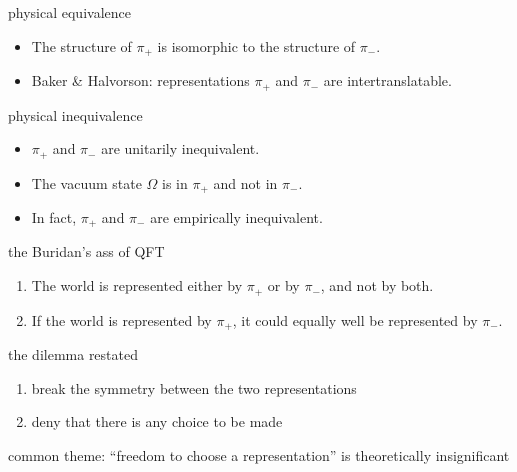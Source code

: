 \documentclass{beamer}
\begin{document}
\begin{frame}{physical equivalence}

\begin{itemize}
\item The structure of $\pi _{+}$ is isomorphic to the structure of
  $\pi _{-}$.
\item Baker \& Halvorson: representations $\pi _{+}$ and $\pi _{-}$
  are intertranslatable.

\end{itemize}


\end{frame}

\begin{frame}{physical inequivalence}

\begin{itemize}
\item $\pi _+$ and $\pi _{-}$ are unitarily inequivalent.
\item The vacuum state $\Omega$ is in $\pi _+$ and not in $\pi
  _{-}$.
\item In fact, $\pi _{+}$ and $\pi _{-}$ are empirically inequivalent.
\end{itemize}


\end{frame}


\begin{frame}{the Buridan's ass of QFT}

\begin{enumerate}
\item The world is represented either by $\pi _{+}$ or by $\pi _{-}$, and not by both.  
\item If the world is represented by $\pi _{+}$, it could equally well
  be represented by $\pi _{-}$.
\end{enumerate}


\end{frame}

\begin{frame}{the dilemma restated}

\begin{enumerate}
\item break the symmetry between the two representations
\item deny that there is any choice to be made
\end{enumerate}

\bigskip
common theme: ``freedom to choose a representation'' is
theoretically insignificant


\end{frame}
\end{document}

